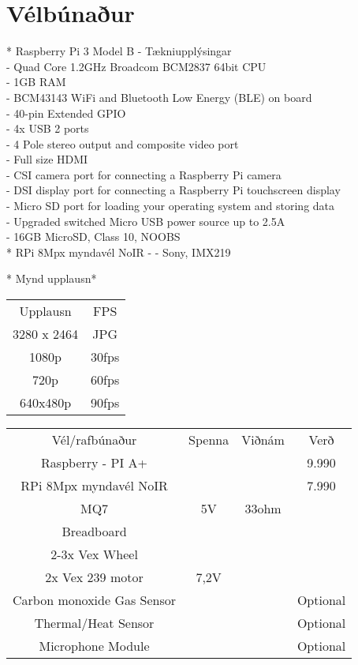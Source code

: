 \section{Vélbúnaður}
* Raspberry Pi 3 Model B - Tækniupplýsingar \\
	- Quad Core 1.2GHz Broadcom BCM2837 64bit CPU \\
	- 1GB RAM \\
	- BCM43143 WiFi and Bluetooth Low Energy (BLE) on board \\
	- 40-pin Extended GPIO \\
	- 4x USB 2 ports \\
	- 4 Pole stereo output and composite video port \\
	- Full size HDMI \\
 	- CSI camera port for connecting a Raspberry Pi camera \\
	- DSI display port for connecting a Raspberry Pi touchscreen display \\
	- Micro SD port for loading your operating system and storing data \\
	- Upgraded switched Micro USB power source up to 2.5A \\
	- 16GB MicroSD, Class 10, NOOBS \\

* RPi 8Mpx myndavél NoIR -
	- Sony, IMX219

	* Mynd upplausn*
\begin{center}
\begin{tabular}{ |c|c| } 
 \hline
 Upplausn & FPS\\ 
 3280 x 2464 & JPG\\
1080p & 30fps\\
720p & 60fps\\ 
640x480p & 90fps\\
 \hline
\end{tabular}
\end{center}

\begin{center}
\begin{tabular}{ |c|c|c|c| } 
 \hline
 Vél/rafbúnaður & Spenna & Viðnám & Verð\\ 
 Raspberry - PI A+  & & & 9.990 \\ 
 RPi 8Mpx myndavél NoIR & & & 7.990\\
 MQ7 & 5V & 33ohm &\\ 
 Breadboard & & & \\
 2-3x Vex Wheel & & & \\
 2x Vex 239 motor & 7,2V & &\\
 Carbon monoxide Gas Sensor   & & & Optional\\
 Thermal/Heat Sensor & & & Optional\\
 Microphone Module & & &  Optional\\

 \hline
\end{tabular}
\end{center}